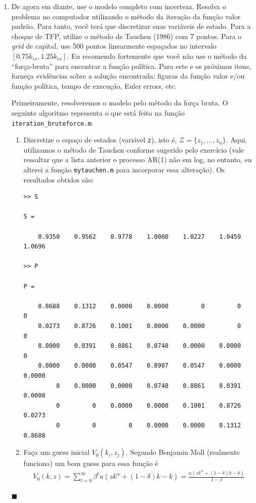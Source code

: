 \documentclass[10pt]{article}
\newcommand*{\QEDA}{\hfill\ensuremath{\blacksquare}}%
\newcommand\0{\mathbf{0}}
\newcounter{exercise}
\newcounter{problem}[exercise]
\newenvironment{sol}
    {\\[1em] {\color{magenta}\text{Resposta.}}
    }
    {{\color{blue!50!black}\QEDA}}
\begin{document}
\begin{enumerate}[wide]
\newpage

\item De agora em diante, use o modelo completo com incerteza. Resolva o
problema no computador utilizando o método da iteração da função
valor padrão. Para tanto, você terá que discretizar suas variáveis de
estado. Para a choque de TFP, utilize o método de Tauchen (1986) com
7 pontos. Para o \textit{grid} de capital, use 500 pontos linearmente espaçados no intervalo $[0.75k_{ss}, 1.25k_{ss}]$. Eu recomendo fortemente que você não use o método da ``força-bruta'' para encontrar a função política. Para este e os próximos itens, forneça evidências sobre a solução encontrada: figuras da função valor e/ou função política, tempo de execução, Euler errors, etc.
\begin{sol}
Primeiramente, resolveremos o modelo pelo método da força bruta. O seguinte algoritmo representa o que está feito na função \texttt{iteration\_bruteforce.m}:
\begin{enumerate}[wide]
\item Discretize o espaço de estados (variável \texttt{z}), isto é, $\mathcal{Z} = \{z_1, \ldots, z_n\}$. Aqui, utilizamos o método de Tauchen conforme sugerido pelo exercício (vale ressaltar que a lista anterior o processo AR(1) não em log, no entanto, eu alterei a função \texttt{mytauchen.m} para incorporar essa alteração). Os resultados obtidos são: \vspace{-0.5cm}
\begin{lstlisting}
>> S

S =

    0.9350    0.9562    0.9778    1.0000    1.0227    1.0459    1.0696

>> P

P =

    0.8688    0.1312    0.0000    0.0000         0         0         0
    0.0273    0.8726    0.1001    0.0000    0.0000         0         0
    0.0000    0.0391    0.8861    0.0748    0.0000    0.0000         0
    0.0000    0.0000    0.0547    0.8907    0.0547    0.0000    0.0000
         0    0.0000    0.0000    0.0748    0.8861    0.0391    0.0000
         0         0    0.0000    0.0000    0.1001    0.8726    0.0273
         0         0         0    0.0000    0.0000    0.1312    0.8688
\end{lstlisting}

\item Faça um guess inicial $V_0(k_i,z_j)$. Segundo Benjamin Moll (realmente funciona) um bom guess para essa função é 
\begin{align*}
V_0(k,z) = \sum_{t=0}^\infty \beta^t u(zk^\alpha + (1-\delta)k - k) = \frac{u(zk^\alpha + (1-\delta)k - k)}{1-\beta}
\end{align*}


\end{enumerate}
\end{sol}
\end{enumerate}
\end{document}
